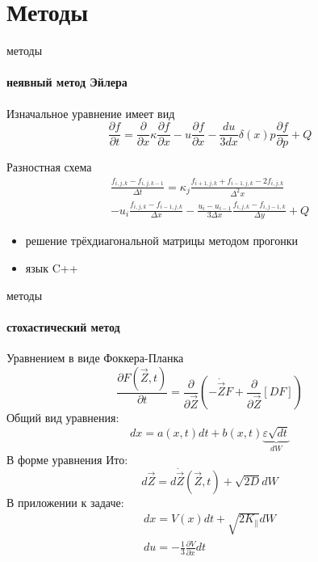 \documentclass[8pt,pdf,hyperref={unicode},serif]{beamer}
\begin{document}
\section{Методы}
\begin{frame}{методы}
\framesubtitle{неявный метод Эйлера}
Изначальное уравнение имеет вид
\begin{equation}
\frac{\partial f}{\partial t} = \frac{\partial}{\partial x} \kappa \frac{\partial f}{\partial x} - u \frac{\partial f}{\partial x} - \frac{du}{3dx} \delta(x) p \frac{\partial f}{\partial p} +Q
\end{equation}

\pause
Разностная схема
\begin{multline}
\frac{f_{i,j,k} - f_{i,j,k-1}}{\Delta t} = \kappa_{j} \frac{f_{i+1,j,k}+f_{i-1,j,k}-2f_{i,j,k}}{\Delta^2 x} \\
- u_i\frac{f_{i,j,k}-f_{i-1,j,k}}{\Delta x}-\frac{u_i-u_{i-1}}{3\Delta x}\frac{f_{i,j,k}-f_{i,j-1,k}}{\Delta y} + Q
\end{multline}
\pause
\begin{itemize}
\item решение трёхдиагональной матрицы методом прогонки
\item язык C++
\end{itemize}
\end{frame}

\begin{frame}{методы}
\framesubtitle{стохастический метод}
Уравнением в виде Фоккера-Планка
\begin{equation}
\frac{\partial F(\vec{Z}, t)}{\partial t} = \frac{\partial}{\partial \vec{Z}}\left( -\dot{\vec{Z}}F+\frac{\partial}{\partial\vec{Z}}[DF]  \right)
\end{equation}
\pause
Общий вид уравнения:
\begin{equation}
dx = a(x, t)dt + b(x,t) \underbrace{\varepsilon \sqrt{dt}}_{dW}
\end{equation}
\pause
В форме уравнения Ито:
\begin{equation}
d\vec{Z} = d\dot{\vec{Z}}(\vec{Z}, t)+\sqrt{2D}dW
\end{equation}
В приложении к задаче:
\begin{eqnarray}
dx = V(x)dt+\sqrt{2K_{\parallel}}dW\\
du = - \frac{1}{3} \frac{\partial V}{\partial x} dt
\end{eqnarray}
\end{frame}
\end{document}
